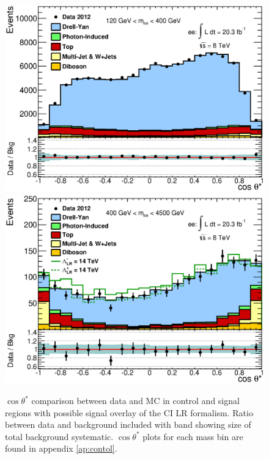 	\begin{figure}[h]
	    \begin{center}
	    	\includegraphics[width=0.9\linewidth]{images/CosThetaStar_Control_main.eps} \\
	    	\includegraphics[width=0.9\linewidth]{images/CosThetaStar_Signal_main.eps}
	    \end{center}
	   \caption{$\cos{\theta^{*}}$ comparison between data and MC in control and signal regions with possible signal overlay of the CI LR formalism. Ratio between data and background included with band showing size of total background systematic. $\cos{\theta^{*}}$ plots for each mass bin are found in appendix \ref{ap:contol}.}
	   \label{fig:cosTS_main}
	\end{figure}

